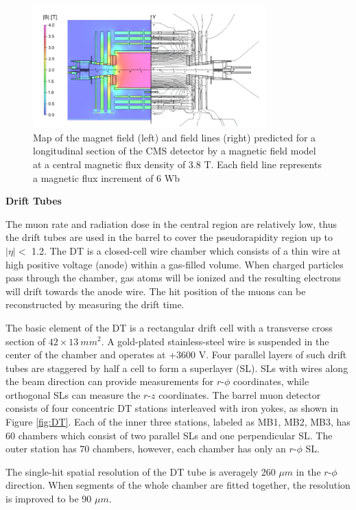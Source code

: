 \documentclass[thesis.tex]{subfiles}
\begin{document}
\begin{figure}[hbtp]
	\centering
	\includegraphics[width=0.8\textwidth]{plot/magnet.png}
	\caption{Map of the magnet field (left) and field lines (right) predicted for a longitudinal section of the CMS detector by a magnetic field model at a central magnetic flux density of 3.8 T. Each field line represents a magnetic flux increment of 6 Wb}
	\label{fig:magnet}
\end{figure}

\noindent \textbf{Drift Tubes} 

The muon rate and radiation dose in the central region are relatively low, thus the drift tubes are used in the barrel to cover the pseudorapidity region up to $|\eta| < $ 1.2.
The DT is a closed-cell wire chamber which consists of a thin wire at high positive voltage (anode) within a gas-filled volume.
When charged particles pass through the chamber, gas atoms will be ionized and the resulting electrons will drift towards the anode wire.
The hit position of the muons can be reconstructed by measuring the drift time.  

The basic element of the DT is a rectangular drift cell with a transverse cross section of $42 \times 13\ mm^2$. 
A gold-plated stainless-steel wire is suspended in the center of the chamber and operates at +3600 V. 
Four parallel layers of such drift tubes are staggered by half a cell to form a superlayer (SL). 
SLs with wires along the beam direction can provide measurements for $r\text{-}\phi$ coordinates, while orthogonal SLs can measure the $r\text{-}z$ coordinates. 
The barrel muon detector consists of four concentric DT stations interleaved with iron yokes, as shown in Figure \ref{fig:DT}.
Each of the inner three stations, labeled as MB1, MB2, MB3, has 60 chambers which consist of two parallel SLs and one perpendicular SL. 
The outer station has 70 chambers, however, each chamber has only an $r\text{-}\phi$ SL. 

The single-hit spatial resolution of the DT tube is averagely 260 $\mu m$ in the $r\text{-}\phi$ direction.
When segments of the whole chamber are fitted together, the resolution is improved to be 90 $\mu m$.
\end{document}

